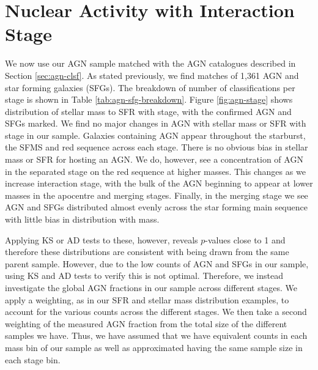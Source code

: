 \section{Nuclear Activity with Interaction Stage}\label{results:AGN_stage}
\noindent We now use our AGN sample matched with the AGN catalogues described in Section \ref{sec:agn-clsf}. As stated previously, we find matches of 1,361 AGN and star forming galaxies (SFGs). The breakdown of number of classifications per stage is shown in Table \ref{tab:agn-sfg-breakdown}. Figure \ref{fig:agn-stage} shows distribution of stellar mass to SFR with stage, with the confirmed AGN and SFGs marked. We find no major changes in AGN with stellar mass or SFR with stage in our sample. Galaxies containing AGN appear throughout the starburst, the SFMS and red sequence across each stage. There is no obvious bias in stellar mass or SFR for hosting an AGN. We do, however, see a concentration of AGN in the separated stage on the red sequence at higher masses. This changes as we increase interaction stage, with the bulk of the AGN beginning to appear at lower masses in the apocentre and merging stages. Finally, in the merging stage we see AGN and SFGs distributed almost evenly across the star forming main sequence with little bias in distribution with mass.

Applying KS or AD tests to these, however, reveals $p$-values close to 1 and therefore these distributions are consistent with being drawn from the same parent sample. However, due to the low counts of AGN and SFGs in our sample, using KS and AD tests to verify this is not optimal. Therefore, we instead investigate the global AGN fractions in our sample across different stages. We apply a weighting, as in our SFR and stellar mass distribution examples, to account for the various counts across the different stages. We then take a second weighting of the measured AGN fraction from the total size of the different samples we have. Thus, we have assumed that we have equivalent counts in each mass bin of our sample as well as approximated having the same sample size in each stage bin.

